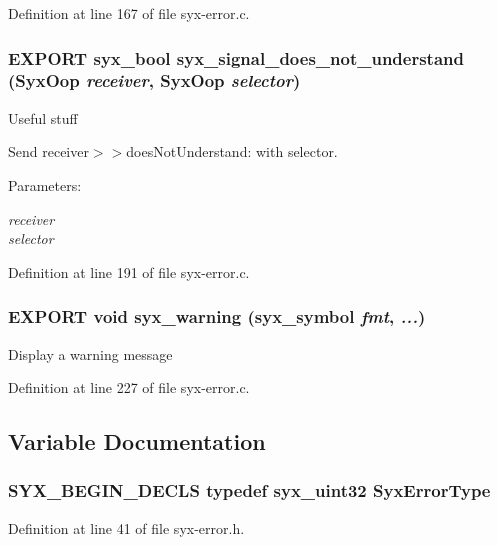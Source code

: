 Definition at line 167 of file syx-error.c.\hypertarget{syx-error_8h_23779d3e58bbb0dcbaa8af8e77b919da}{
\subsubsection{\setlength{\rightskip}{0pt plus 5cm}EXPORT {\bf syx\_\-bool} syx\_\-signal\_\-does\_\-not\_\-understand ({\bf SyxOop} {\em receiver}, \/  {\bf SyxOop} {\em selector})}}
\label{syx-error_8h_23779d3e58bbb0dcbaa8af8e77b919da}


Useful stuff

Send receiver$>$$>$doesNotUnderstand: with selector.

\begin{Desc}
\item[Parameters:]
\begin{description}
\item[{\em receiver}]\item[{\em selector}]\end{description}
\end{Desc}


Definition at line 191 of file syx-error.c.\hypertarget{syx-error_8h_d4d9bee8d3e66d1127c3be0d5a2c6213}{
\subsubsection{\setlength{\rightskip}{0pt plus 5cm}EXPORT void syx\_\-warning ({\bf syx\_\-symbol} {\em fmt}, \/   {\em ...})}}
\label{syx-error_8h_d4d9bee8d3e66d1127c3be0d5a2c6213}


Display a warning message 

Definition at line 227 of file syx-error.c.

\subsection{Variable Documentation}
\hypertarget{syx-error_8h_514c3f7a5b2ca79dc0d2ba5e1464a36e}{
\subsubsection{\setlength{\rightskip}{0pt plus 5cm}SYX\_\-BEGIN\_\-DECLS typedef {\bf syx\_\-uint32} {\bf SyxErrorType}}}
\label{syx-error_8h_514c3f7a5b2ca79dc0d2ba5e1464a36e}




Definition at line 41 of file syx-error.h.